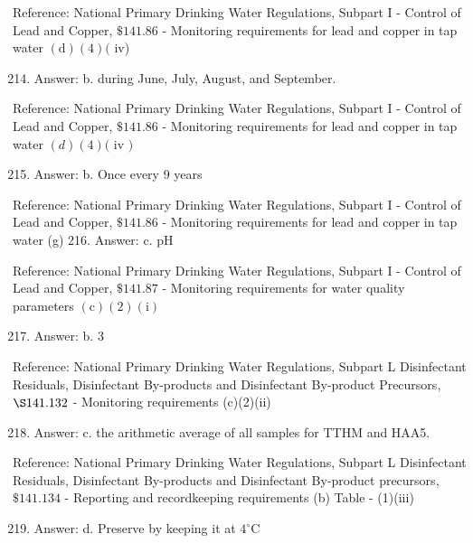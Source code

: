 \documentclass[10pt]{article}
\begin{document}
Reference: National Primary Drinking Water Regulations, Subpart I - Control of Lead and Copper, $\$ 141.86$ - Monitoring requirements for lead and copper in tap water $(\mathrm{d})(4)($ iv)

\begin{enumerate}
  \setcounter{enumi}{213}
  \item Answer: b. during June, July, August, and September.
\end{enumerate}

Reference: National Primary Drinking Water Regulations, Subpart I - Control of Lead and Copper, $\$ 141.86$ - Monitoring requirements for lead and copper in tap water $(d)(4)($ iv $)$

\begin{enumerate}
  \setcounter{enumi}{214}
  \item Answer: b. Once every 9 years
\end{enumerate}

Reference: National Primary Drinking Water Regulations, Subpart I - Control of Lead and Copper, $\$ 141.86$ - Monitoring requirements for lead and copper in tap water (g) 216. Answer: c. $\mathrm{pH}$

Reference: National Primary Drinking Water Regulations, Subpart I - Control of Lead and Copper, $\$ 141.87$ - Monitoring requirements for water quality parameters $(\mathrm{c})(2)(\mathrm{i})$

\begin{enumerate}
  \setcounter{enumi}{216}
  \item Answer: b. 3
\end{enumerate}

Reference: National Primary Drinking Water Regulations, Subpart L Disinfectant Residuals, Disinfectant By-products and Disinfectant By-product Precursors, $\S 141.132$ - Monitoring requirements (c)(2)(ii)

\begin{enumerate}
  \setcounter{enumi}{217}
  \item Answer: c. the arithmetic average of all samples for TTHM and HAA5.
\end{enumerate}

Reference: National Primary Drinking Water Regulations, Subpart L Disinfectant Residuals, Disinfectant By-products and Disinfectant By-product precursors, $\$ 141.134$ - Reporting and recordkeeping requirements (b) Table - (1)(iii)

\begin{enumerate}
  \setcounter{enumi}{218}
  \item Answer: d. Preserve by keeping it at $4^{\circ} \mathrm{C}$
\end{enumerate}
\end{document}
